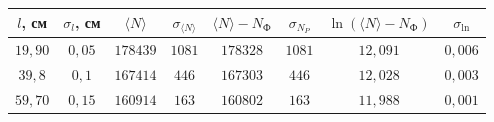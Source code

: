 \begin{tabular}{| c | c | c | c | c | c | c | c |}
\hline
$l$, см & $\sigma_l$, см & $\langle N \rangle$ & $\sigma_{\langle N \rangle}$ &
$\langle N \rangle-N_{\text{Ф}}$ & $\sigma_{N_P}$ & $\ln{(\langle N
\rangle-N_{\text{Ф}})}$ & $\sigma_{\ln}$\\
\hline
$19,90$ & $0,05$ & $178439$ & $1081$ & $178328$ & $1081$ & $12,091$ & $0,006$\\
\hline
$39,8$ & $0,1$ & $167414$ & $446$ & $167303$ & $446$ & $12,028$ & $0,003$\\
\hline
$59,70$ & $0,15$ & $160914$ & $163$ & $160802$ & $163$ & $11,988$ & $0,001$\\
\hline
\end{tabular}
